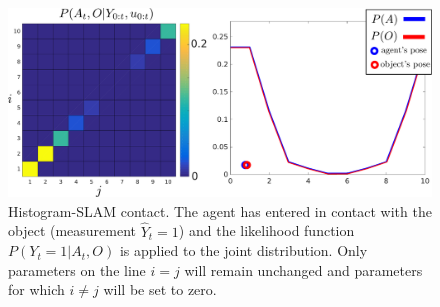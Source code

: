 \begin{figure}
 \centering
 \includegraphics[width=\textwidth]{./ch5-MLMF/Figures/explenation/joint_marginal_contact.pdf}
 \caption{Histogram-SLAM contact. The agent has entered in contact with the object (measurement $\hat{Y}_t = 1$) and the likelihood function $P(Y_t=1|A_t,O)$ is applied to the joint
 distribution. Only parameters on the line $i=j$ will remain unchanged and parameters for which $i \not= j$ will be set to zero.}
 \label{fig:discrete_example_contact}
\end{figure}






